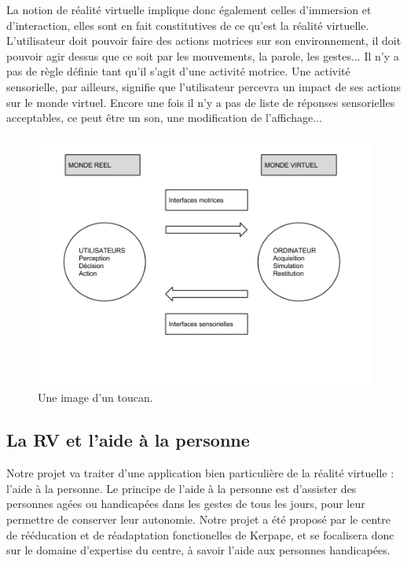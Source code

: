 La notion de réalité virtuelle implique donc également celles d'immersion et d'interaction, elles sont en fait constitutives de ce  qu'est la réalité virtuelle. L'utilisateur doit pouvoir faire des actions motrices sur son environnement, il doit pouvoir agir dessus que ce soit par les mouvements, la parole, les gestes... Il n'y a pas de règle définie tant qu'il s'agit d'une activité motrice. 
Une activité sensorielle, par ailleurs, signifie que l'utilisateur percevra un impact de ses actions sur le monde virtuel. Encore une fois il n'y a pas de liste de réponses sensorielles acceptables, ce peut être un son, une modification de l'affichage...
\begin{figure}
  \caption{Une image d'un toucan.}
  \centering
  \includegraphics[scale=0.5,bb=0 0 960 720]{1-PreEtude/graphe_interfaces.png}
\end{figure}	%

\subsection{La RV et l'aide à la personne}
Notre projet va traiter d'une application bien particulière de la réalité virtuelle : l'aide à la personne. Le principe de l'aide à la personne est d'assister des personnes agées ou handicapées dans les gestes de tous les jours, pour leur permettre de conserver leur autonomie. Notre projet a été proposé par le centre de rééducation et de réadaptation fonctionelles de Kerpape, et se focalisera donc sur le domaine d'expertise du centre, à savoir l'aide aux personnes handicapées. \\

